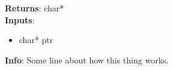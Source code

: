 \textbf{Returns}: char*\\

\textbf{Inputs}:
    \begin{itemize}
        \item{char* ptr}
    \end{itemize}

\textbf{Info}: Some line about how this thing works.


